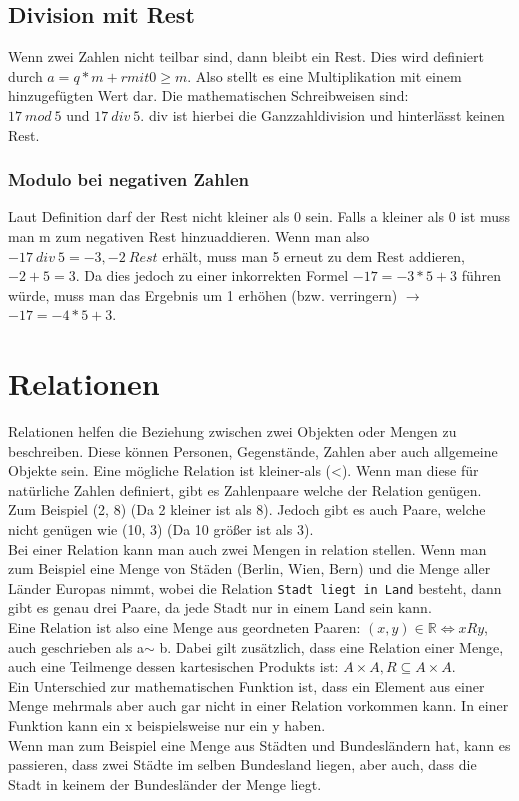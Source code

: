 \documentclass{article}
\newcommand{\R}{\mathbb{R}}
\begin{document}
	 \subsection{Division mit Rest}
	 Wenn zwei Zahlen nicht teilbar sind, dann bleibt ein Rest. Dies wird definiert durch $a=q*m+r mit 0\geq m$. Also stellt es eine Multiplikation mit einem hinzugefügten Wert dar. Die mathematischen Schreibweisen sind: \\
	 $17\ mod\ 5$ und $17\ div\ 5$. div ist hierbei die Ganzzahldivision und hinterlässt keinen Rest.
	 \subsubsection{Modulo bei negativen Zahlen}
	 Laut Definition darf der Rest nicht kleiner als 0 sein. Falls a kleiner als 0 ist muss man m zum negativen Rest hinzuaddieren. Wenn man also $-17\ div\ 5=-3, -2\ Rest$ erhält, muss man 5 erneut zu dem Rest addieren, $-2+5=3$. Da dies jedoch zu einer inkorrekten Formel $-17=-3*5+3$ führen würde, muss man das Ergebnis um 1 erhöhen (bzw. verringern) $\to$ $-17=-4*5+3$. \\
	 \section{Relationen}
	 Relationen helfen die Beziehung zwischen zwei Objekten oder Mengen zu beschreiben. Diese können Personen, Gegenstände, Zahlen aber auch allgemeine Objekte sein. Eine mögliche Relation ist kleiner-als (<). Wenn man diese für natürliche Zahlen definiert, gibt es Zahlenpaare welche der Relation genügen. Zum Beispiel (2, 8) (Da 2 kleiner ist als 8). Jedoch gibt es auch Paare, welche nicht genügen wie (10, 3) (Da 10 größer ist als 3). \\
	 Bei einer Relation kann man auch zwei Mengen in relation stellen. Wenn man zum Beispiel eine Menge von Städen (Berlin, Wien, Bern) und die Menge aller Länder Europas nimmt, wobei die Relation \verb|Stadt liegt in Land| besteht, dann gibt es genau drei Paare, da jede Stadt nur in einem Land sein kann. \\
	 Eine Relation ist also eine Menge aus geordneten Paaren: $(x,y)\in\R\iff xRy$, auch geschrieben als a$\sim$ b. Dabei gilt zusätzlich, dass eine Relation einer Menge, auch eine Teilmenge dessen kartesischen Produkts ist: $A\times A, R \subseteq A\times A$. \\
	 Ein Unterschied zur mathematischen Funktion ist, dass ein Element aus einer Menge mehrmals aber auch gar nicht in einer Relation vorkommen kann. In einer Funktion kann ein x beispielsweise nur ein y haben. \\
	 Wenn man zum Beispiel eine Menge aus Städten und Bundesländern hat, kann es passieren, dass zwei Städte im selben Bundesland liegen, aber auch, dass die Stadt in keinem der Bundesländer der Menge liegt.
\end{document}
